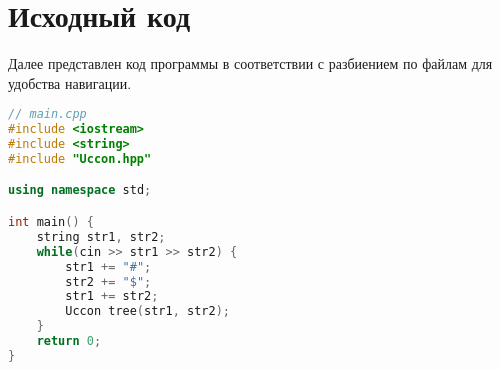 \pagebreak

\section{Исходный код}

Далее представлен код программы в соответствии с разбиением по файлам для удобства навигации.

\begin{lstlisting}[language=C++]
// main.cpp
#include <iostream>
#include <string>
#include "Uccon.hpp"

using namespace std;

int main() {
    string str1, str2;
    while(cin >> str1 >> str2) {
        str1 += "#";
        str2 += "$";
        str1 += str2;
        Uccon tree(str1, str2);
    }
    return 0;
}
\end{lstlisting}

